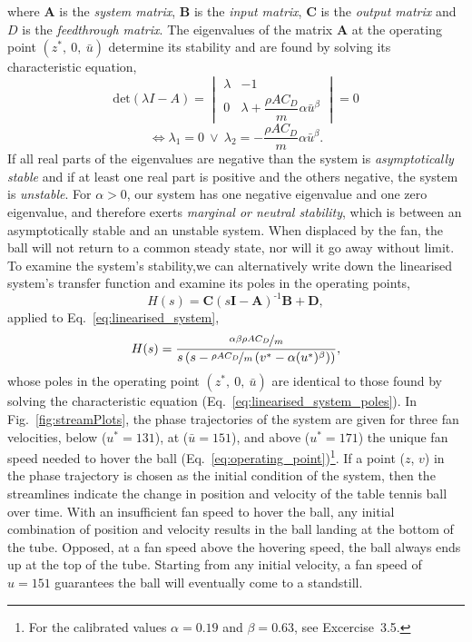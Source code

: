 \documentclass[10pt,twoside,openright]{article}
\begin{document}
where $\bm{A}$ is the \textit{system matrix}, $\bm{B}$ is the \textit{input matrix}, $\bm{C}$ is the \textit{output matrix} and $D$ is the \textit{feedthrough matrix}. The eigenvalues of the matrix $\bm{A}$ at the operating point $(z^*,~0,~ \bar{u})$ determine its stability and are found by solving its characteristic equation,
\begin{equation}
\text{det}\left( \lambda I - A \right) = 
\begin{vmatrix}
\lambda & -1 \\
0 & \lambda + \dfrac{\rho A C_D}{m}  \alpha \bar{u}^\beta
\end{vmatrix}
= 0
\end{equation}
\begin{equation}\label{eq:linearised_system_poles}
\iff \lambda_1 = 0\ \lor\ \lambda_2 = - \dfrac{\rho A C_D}{m} \alpha \bar{u}^\beta.
\end{equation}
If all real parts of the eigenvalues are negative than the system is \textit{asymptotically stable} and if at least one real part is positive and the others negative, the system is \textit{unstable}. For $\alpha>0$, our system has one negative eigenvalue and one zero eigenvalue, and therefore exerts \textit{marginal or neutral stability}, which is between an asymptotically stable and an unstable system. When displaced by the fan, the ball will not return to a common steady state, nor will it go away without limit. To examine the system's stability,we can alternatively write down the linearised system's transfer function and examine its poles in the operating points,
\begin{equation}
H(s) = \bm{C} (s \bm{I} - \bm{A})^{\text{-}1} \bm{B} + \bm{D},
\end{equation}
applied to Eq.~\ref{eq:linearised_system},
\begin{equation}
H(s) = \dfrac{\nicefrac{\alpha \beta \rho A C_D}{m}}{s \left(s - \nicefrac{\rho A C_D}{m} \left(v^* - \alpha (u^*)^\beta\right) \right)},
\end{equation}
whose poles in the operating point $(z^*,~ 0,~ \bar{u})$ are identical to those found by solving the characteristic equation (Eq.~\ref{eq:linearised_system_poles}). In Fig.~\ref{fig:streamPlots}, the phase trajectories of the system are given for three fan velocities, below ($u^* = 131$), at ($\bar{u} = 151$), and above ($u^* = 171$) the unique fan speed needed to hover the ball (Eq.~\ref{eq:operating_point})\footnote{For the calibrated values $\alpha = 0.19$ and $\beta = 0.63$, see Excercise~3.5.}. If a point ($z$, $v$) in the phase trajectory is chosen as the initial condition of the system, then the streamlines indicate the change in position and velocity of the table tennis ball over time. With an insufficient fan speed to hover the ball, any initial combination of position and velocity results in the ball landing at the bottom of the tube. Opposed, at a fan speed above the hovering speed, the ball always ends up at the top of the tube. Starting from any initial velocity, a fan speed of $u = 151$ guarantees the ball will eventually come to a standstill.
\end{document}
